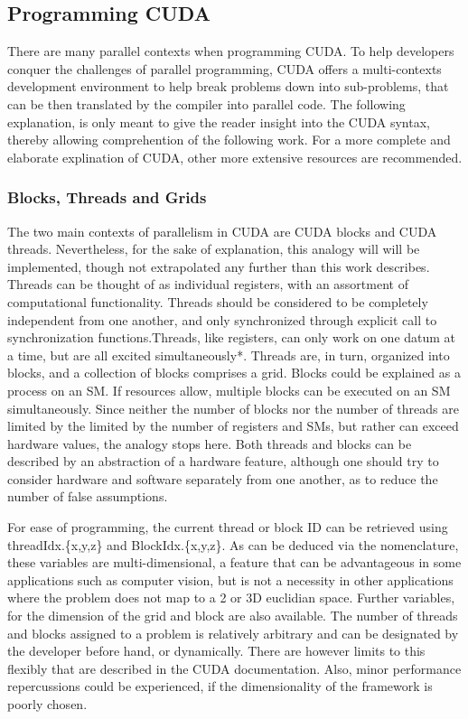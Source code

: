 \subsection{Programming CUDA}

There are many parallel contexts when programming CUDA. To help developers conquer
the challenges of parallel programming, CUDA offers a multi-contexts development
environment to help break problems down into sub-problems, that can be then translated
by the compiler into parallel code. The following explanation, is only meant to
give the reader insight into the CUDA syntax, thereby allowing comprehention of
the following work. For a more complete and elaborate explination of CUDA, other
more extensive resources are recommended\cite[e.g.]{Wilt,Sanders,driver}.
\subsubsection{Blocks, Threads and Grids}
The two main contexts of parallelism in CUDA are CUDA blocks and CUDA threads.
Nevertheless, for the sake of explanation, this analogy will
will be implemented, though not extrapolated any further than this work describes.
Threads can be thought of as individual registers, with an assortment of computational
functionality.  Threads should be considered to be completely independent from one another,
and only synchronized through explicit call to synchronization functions.Threads, like
registers, can only work on one datum at a time, but are all excited simultaneously*.
Threads are, in turn, organized into blocks, and a collection of blocks comprises a grid.
Blocks could be explained as a process on an SM. If resources allow, multiple blocks can
be executed on an \Gls{SM} simultaneously. Since neither the number of blocks nor the
number of threads are limited by the limited by the number of registers and \Glspl{SM},
but rather can exceed hardware values, the analogy stops here.  Both
threads and blocks can be described by an abstraction of a hardware feature, although one should try to
consider hardware and software separately from one another, as to reduce the number
of false assumptions.
\par
For ease of programming, the current thread or block ID can be retrieved using
 threadIdx.\{x,y,z\} and BlockIdx.\{x,y,z\}. As can be deduced via the nomenclature,
 these variables are multi-dimensional, a feature that can be advantageous in some
 applications such as computer vision, but is not a necessity in other applications
where the problem does not map to a 2 or 3D euclidian space. Further variables,
for the dimension of the grid and block are also available. %
The number of threads and blocks assigned to a problem is relatively arbitrary and can
be designated by the developer before hand, or dynamically.  There are however limits
to this flexibly that are described in the CUDA documentation\cite{?}.  Also, minor performance
repercussions could be experienced, if the dimensionality of the framework is poorly
chosen.
